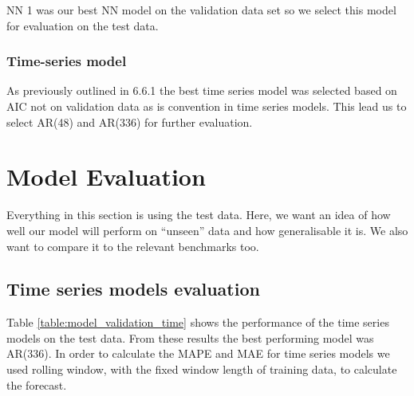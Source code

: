 \documentclass[11pt]{article}
\begin{document}
\noindent NN 1 was our best NN model on the validation data set so we select this model for evaluation on the test data.

\subsubsection{Time-series model}

As previously outlined in 6.6.1 the best time series model was selected based on AIC not on validation data as is convention in time series models. This lead us to select AR(48) and AR(336) for further evaluation. 

\section{Model Evaluation}
\label{section:model_evaluation}

Everything in this section is using the test data. Here, we want an idea of how well our model will perform on “unseen” data and how generalisable it is. We also want to compare it to the relevant benchmarks too.

\subsection{Time series models evaluation}
\label{section:performance_metrics}

Table \ref{table:model_validation_time} shows the performance of the time series models on the test data. From these results the best performing model was AR(336). In order to calculate the MAPE and MAE for time series models we used rolling window, with the fixed window length of training data, to calculate the forecast.
\end{document}
